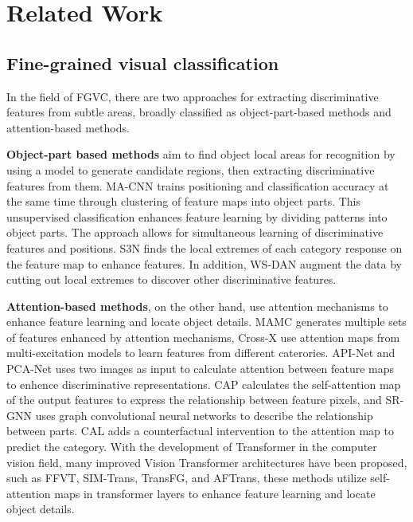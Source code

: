 \documentclass[journal]{IEEEtran}
\begin{document}
\section{Related Work}

\subsection{Fine-grained visual classification}
In the field of FGVC, there are two approaches for extracting discriminative features from subtle areas, broadly classified as object-part-based methods and attention-based methods.

\textbf{Object-part based methods} aim to find object local areas for recognition by using a model to generate candidate regions, then extracting discriminative features from them. MA-CNN\cite{MA-CNN} trains positioning and classification accuracy at the same time through clustering of feature maps into object parts. This unsupervised classification enhances feature learning by dividing patterns into object parts. The approach allows for simultaneous learning of discriminative features and positions. S3N\cite{S3Ns} finds the local extremes of each category response on the feature map to enhance features. In addition, WS-DAN\cite{WS-DAN} augment the data by cutting out local extremes to discover other discriminative features.

\textbf{Attention-based methods}, on the other hand, use attention mechanisms to enhance feature learning and locate object details. MAMC\cite{MAMC} generates multiple sets of features enhanced by attention mechanisms, Cross-X\cite{Cross-X} 
use attention maps from multi-excitation models to learn features from different caterories. API-Net\cite{API-Net} and PCA-Net\cite{PCA-Net} uses two images as input to calculate attention between feature maps to enhence discriminative representations. CAP\cite{CAP} calculates the self-attention map of the output features to express the relationship between feature pixels, and SR-GNN\cite{SR-GNN} uses graph convolutional neural networks to describe the relationship between parts. CAL\cite{CAL} adds a counterfactual intervention to the attention map to predict the category. With the development of Transformer\cite{Transformer} in the computer vision field, many improved Vision Transformer architectures have been proposed, such as FFVT\cite{FFVT}, SIM-Trans\cite{SIM-TRans}, TransFG\cite{TransFG}, and AFTrans\cite{AFTrans}, these methods utilize self-attention maps in transformer layers to enhance feature learning and locate object details.
\end{document}

